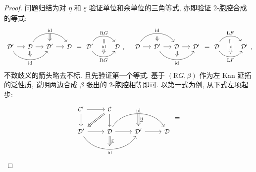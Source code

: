 \begin{proof}
	问题归结为对 $\underline{\eta}$ 和 $\underline{\varepsilon}$ 验证单位和余单位的三角等式, 亦即验证 $2$-胞腔合成的等式:
	\begin{equation*}\begin{gathered}
		\begin{tikzcd}[column sep=small, every cell/.append style = {font = \small}]
			\mathcal{D}' \arrow[r] \arrow[bend right=60, rr, "\identity"', "" {name=I}] & \mathcal{D} \arrow[r] \arrow[rr, bend left=60, "\identity", "" {name=J}] \arrow[Rightarrow, to=I] & \mathcal{D}' \arrow[r] \arrow[Rightarrow, from=J] & \mathcal{D}
		\end{tikzcd} = \begin{tikzcd}[every cell/.append style = {font = \small}]
			\mathcal{D}' \arrow[r, bend left=60, "{\mathrm{R}G}", ""' {name=A}] \arrow[r, bend right=60, "{\mathrm{R}G}"', "" {name=B}] & \mathcal{D} \arrow[Rightarrow, from=A, to=B, "\identity" description]
		\end{tikzcd} , \quad
		\begin{tikzcd}[column sep=small, every cell/.append style = {font = \small}]
			\mathcal{D} \arrow[r] \arrow[bend left=60, rr, "\identity", ""' {name=I}] & \mathcal{D}' \arrow[r] \arrow[Rightarrow, from=I] \arrow[bend right=60, rr, "\identity"', "" {name=J}] & \mathcal{D} \arrow[r] \arrow[Rightarrow, to=J] & \mathcal{D}'
		\end{tikzcd} = \begin{tikzcd}[every cell/.append style = {font = \small}]
			\mathcal{D} \arrow[r, bend left=60, "{\mathrm{L}F}", ""' {name=A}] \arrow[r, bend right=60, "{\mathrm{L}F}"', "" {name=B}] & \mathcal{D}' \arrow[Rightarrow, from=A, to=B, "\identity" description]
		\end{tikzcd},
	\end{gathered}\end{equation*}
	不致歧义的箭头略去不标. 且先验证第一个等式. 基于 $(\mathrm{R}G, \beta)$ 作为左 Kan 延拓的泛性质, 说明两边合成 $\beta$ 张出的 2-胞腔相等即可. 以第一式为例, 从下式左项起步:
	\[\begin{tikzcd}[every cell/.append style = {font = \small}]
		\mathcal{C}' \arrow[r] \arrow[d] & \mathcal{C} \arrow[d] \arrow[Rightarrow, ld] & & \\
		\mathcal{D}' \arrow[r] \arrow[bend right=60, rr, "\identity"', "" {name=I}] & \mathcal{D} \arrow[r] \arrow[rr, bend left=60, "\identity", "" {name=J}] \arrow[Rightarrow, to=I, "\underline{\varepsilon}"] & \mathcal{D}' \arrow[r] \arrow[Rightarrow, from=J, "\underline{\eta}"] & \mathcal{D}
	\end{tikzcd} = \begin{tikzcd}[every cell/.append style = {font = \small}]

\end{tikzcd}\]
\end{proof}
